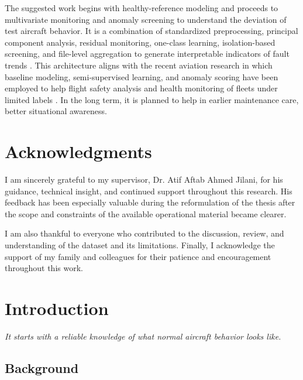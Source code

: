 \documentclass[12pt,a4paper]{report}
\newcommand{\SupervisorName}{Dr. Atif Aftab Ahmed Jilani}
\newcommand{\chapterquote}[1]{%
	\begin{flushright}
		\itshape #1
	\end{flushright}
}
\begin{document}
	The suggested work begins with healthy-reference modeling and proceeds to multivariate monitoring and anomaly screening to understand the deviation of test aircraft behavior. It is a combination of standardized preprocessing, principal component analysis, residual monitoring, one-class learning, isolation-based screening, and file-level aggregation to generate interpretable indicators of fault trends \cite{macgregor1995spc,scholkopf2001ocsvm,liu2008iforest}. This architecture aligns with the recent aviation research in which baseline modeling, semi-supervised learning, and anomaly scoring have been employed to help flight safety analysis and health monitoring of fleets under limited labels \cite{janakiraman2016elm,memarzadeh2022resad,basora2021fleet}. In the long term, it is planned to help in earlier maintenance care, better situational awareness.
	
	\chapter*{Acknowledgments}
	
	I am sincerely grateful to my supervisor, \SupervisorName, for his guidance, technical insight, and continued support throughout this research. His feedback has been especially valuable during the reformulation of the thesis after the scope and constraints of the available operational material became clearer.
	
	I am also thankful to everyone who contributed to the discussion, review, and understanding of the dataset and its limitations. Finally, I acknowledge the support of my family and colleagues for their patience and encouragement throughout this work.
	
	
	\clearpage
	\tableofcontents
	\listoffigures
	\listoftables
	
	\clearpage
	
	\chapter{Introduction}
	\chapterquote{It starts with a reliable knowledge of what normal aircraft behavior looks like.}
	
	\section{Background}
	
\end{document}
